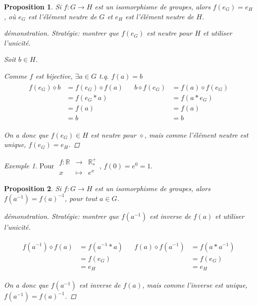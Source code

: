 \documentclass{report}
\newcommand*{\reels}{\mathbb{R}}
\newtheorem*{prop}{Proposition}
\theoremstyle{definition}
\theoremstyle{remark}
\newtheorem*{exem}{Exemple}
\begin{document}
	\begin{prop}
		Si $f:G \to H$ est un isomorphisme de groupes, alors $f(e_G)=e_H$, o\`u $e_G$ est l'\'el\'ement neutre de $G$ et $e_H$ est l'\'el\'ement neutre de $H$.
		\begin{proof}[d\'emonstration]
			Strat\'egie: montrer que $f(e_G)$ est neutre pour $H$ et utiliser l'unicit\'e.

			Soit $b \in H$.

			Comme $f$ est bijective, $\exists a \in G$ t.q. $f(a)=b$
			\begin{align*}
				\begin{split}
					f(e_G) \diamond b&= f(e_G) \diamond f(a)\\
					&= f(e_G*a)\\
					&= f(a)\\
					&=b
				\end{split}
				&
				\begin{split}
					b \diamond f(e_G)&= f(a) \diamond f(e_G)\\
					&= f(a*e_G)\\
					&= f(a)\\
					&= b
				\end{split}
			\end{align*}

			On a donc que $f(e_G) \in H$ est neutre pour $\diamond$, mais comme l'\'el\'ement neutre est unique, $f(e_G)=e_H$.
		\end{proof}
	\end{prop}
	\begin{exem}
		Pour $\begin{array}{rcl}
			f:\reels&\to&\reels^+_*\\
			x&\mapsto&e^x
		\end{array}$, $f(0)=e^0=1$.
	\end{exem}
	\begin{prop}
		Si $f:G \to H$ est un isomorphisme de groupes, alors $f(a^{-1})=f(a)^{-1}$, pour tout $a \in G$.
		\begin{proof}[d\'emonstration]
			Strat\'egie: montrer que $f(a^{-1})$ est inverse de $f(a)$ et utiliser l'unicit\'e.

			\begin{align*}
				\begin{split}
					f(a^{-1}) \diamond f(a)&= f(a^{-1}*a)\\
					&= f(e_G)\\
					&= e_H
				\end{split}
				&
				\begin{split}
					f(a) \diamond f(a^{-1})&= f(a*a^{-1})\\
					&= f(e_G)\\
					&= e_H
				\end{split}
			\end{align*}

			On a donc que $f(a^{-1})$ est inverse de $f(a)$, mais comme l'inverse est unique, $f(a^{-1})=f(a)^{-1}$.
		\end{proof}
	\end{prop}
\end{document}
